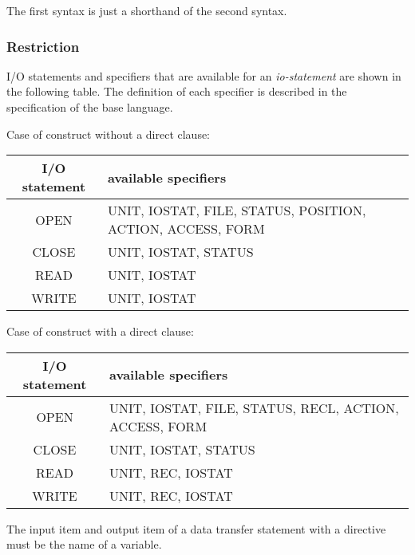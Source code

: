    The first syntax is just a shorthand of the second syntax.

   \subsubsection*{Restriction}

   I/O statements and specifiers that are available for an {\it io-statement} are
   shown in the following table.
   The definition of each specifier is described in the specification of the base language. 

   Case of \gio construct without a direct clause:
   \begin{table}[h]
   \begin{center}
    \label{tb:globalstatement}
    \begin{tabular}{|c||l|}
      \hline
     I/O statement & available specifiers \\ \hline \hline
     OPEN & UNIT, IOSTAT, FILE, STATUS, POSITION, ACTION, ACCESS, FORM \\ \hline
     CLOSE & UNIT, IOSTAT, STATUS \\ \hline
     READ & UNIT, IOSTAT \\ \hline
     WRITE & UNIT, IOSTAT \\ \hline
    \end{tabular}
   \end{center}
   \end{table}

   Case of \gio construct with a direct clause:
   \begin{table}[h]
   \begin{center}
    \label{tb:globalstatement}
    \begin{tabular}{|c||l|}
      \hline
     I/O statement & available specifiers \\ \hline \hline
     OPEN & UNIT, IOSTAT, FILE, STATUS, RECL, ACTION, ACCESS, FORM \\ \hline
     CLOSE & UNIT, IOSTAT, STATUS \\ \hline
     READ & UNIT, REC, IOSTAT \\ \hline
     WRITE & UNIT, REC, IOSTAT \\ \hline
    \end{tabular}
   \end{center}
   \end{table}

   The input item and output item of a data transfer statement with
   a \gio directive must be the name of a variable.
   
